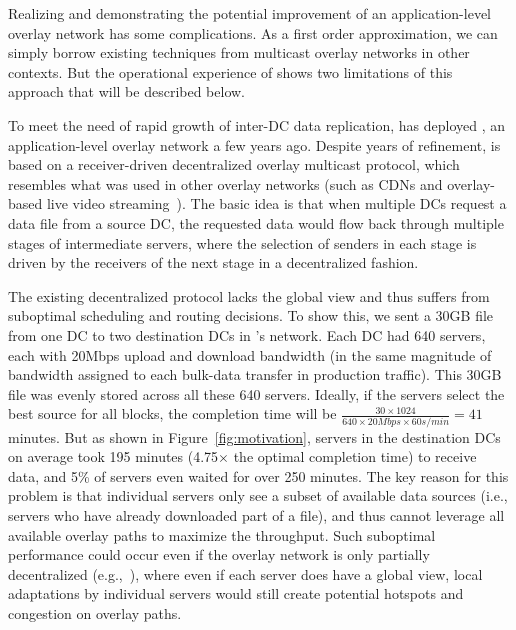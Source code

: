 Realizing and demonstrating the potential improvement of an application-level
overlay network has some complications. As a first order approximation, we can
simply borrow existing techniques from multicast overlay networks
in other contexts. But the operational experience of \company shows
two limitations of this approach that will be described below.

To meet the need of rapid growth of inter-DC data replication,
\company has deployed \alg, an application-level overlay network a few
years ago. Despite years of refinement, \alg is based on a
receiver-driven decentralized overlay multicast protocol, which
resembles what was used in other overlay networks (such as CDNs and
overlay-based live video
streaming~\cite{Andreev2013Designing,sripanidkulchai2004analysis,zhang2005coolstreaming}).
The basic idea is that when multiple DCs request a data file from
a source DC, the requested data would flow back through multiple
stages of intermediate servers,  where the selection of senders in
each stage is driven by the receivers of the next stage in a
decentralized fashion.

The existing decentralized protocol lacks the global view and thus
suffers from suboptimal scheduling and routing decisions.
To show this, we sent a 30GB file from one DC to two destination
DCs in \company's network. Each DC had 640 servers, each with 20Mbps
upload and download bandwidth (in the same magnitude of bandwidth
assigned to each bulk-data transfer in production traffic).
This 30GB file was evenly stored across all these 640 servers.
Ideally, if the servers select the best source for all blocks, the
completion time will be
$\frac{30\times 1024}{640\times 20Mbps \times 60s/min} = 41$
minutes. But as shown in Figure~\ref{fig:motivation},
servers in the destination DCs on average took 195 minutes (4.75$\times$
the optimal completion time) to receive data, and 5\% of servers even
waited for over 250 minutes.
The key reason for this problem is that individual servers only see a subset of
available data sources (i.e., servers who have already downloaded part of
a file), and thus cannot leverage all available overlay paths to
maximize the throughput. Such suboptimal performance could occur even if
the overlay network is only partially decentralized (e.g.,~\cite{Huang2014A}),
where even if each server does have a global view, local adaptations by
individual servers would still create potential hotspots and congestion on
overlay paths.


